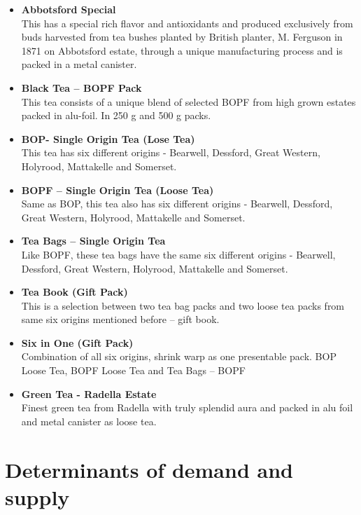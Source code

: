 \documentclass[12pt]{report}
\begin{document}
\begin{itemize}
	\item {\bf{Abbotsford Special}} \\
	      This has a special rich flavor and antioxidants and produced exclusively from buds harvested from tea bushes planted by British planter, M. Ferguson in 1871 on Abbotsford estate, through a unique manufacturing process and is packed in a metal canister.

	\item {\bf{Black Tea – BOPF Pack}} \\
	      This tea consists of a unique blend of selected BOPF from high grown estates packed in alu-foil. In 250 g and 500 g packs.

	\item {\bf{BOP- Single Origin Tea (Lose Tea)}} \\
	      This tea has six different origins - Bearwell, Dessford, Great Western, Holyrood, Mattakelle and Somerset.

	\item {\bf{BOPF – Single Origin Tea (Loose Tea)}} \\
	      Same as BOP, this tea also has six different origins - Bearwell, Dessford, Great Western, Holyrood, Mattakelle and Somerset.

	\item {\bf{Tea Bags – Single Origin Tea}} \\
	      Like BOPF, these tea bags have the same six different origins - Bearwell, Dessford, Great Western, Holyrood, Mattakelle and Somerset.

	\item {\bf{Tea Book (Gift Pack) }} \\
	      This is a selection between two tea bag packs and two loose tea packs from same six origins mentioned before – gift book.

	\item {\bf{Six in One (Gift Pack) }} \\
	      Combination of all six origins, shrink warp as one presentable pack. BOP Loose Tea, BOPF Loose Tea and Tea Bags – BOPF

	\item {\bf{Green Tea - Radella Estate}} \\
	      Finest green tea from Radella with truly splendid aura and packed in alu foil and metal canister as loose tea.
\end{itemize}

\chapter{Determinants of demand and supply}
\end{document}
